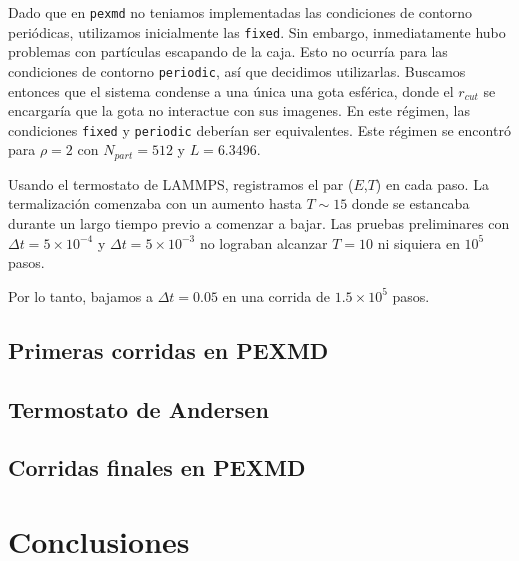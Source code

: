 \documentclass[twoside, 12pt]{article}
\begin{document}
Dado que en \texttt{pexmd} no teniamos implementadas las condiciones de contorno periódicas, utilizamos inicialmente las \texttt{fixed}. Sin embargo, inmediatamente hubo problemas con partículas escapando de la caja. Esto no ocurría para las condiciones de contorno \texttt{periodic}, así que decidimos utilizarlas. Buscamos entonces que el sistema condense a una única una gota esférica, donde el $r_{cut}$ se encargaría que la gota no interactue con sus imagenes. En este régimen, las condiciones \texttt{fixed} y \texttt{periodic} deberían ser equivalentes. Este régimen se encontró para $\rho=2$ con $N_{part}=512$ y $L=6.3496$.

Usando el termostato de LAMMPS, registramos el par ($E$,$T$) en cada paso. La termalización comenzaba con un aumento hasta $T\sim 15$ donde se estancaba durante un largo tiempo previo a comenzar a bajar. Las pruebas preliminares con $\Delta t= 5\times 10^{-4}$ y $\Delta t= 5\times 10^{-3}$ no lograban alcanzar $T=10$ ni siquiera en $10^5$ pasos.

Por lo tanto, bajamos a $\Delta t = 0.05$ en una corrida de $1.5\times10^{5}$ pasos.
\subsection{Primeras corridas en PEXMD}
\subsection{Termostato de Andersen}
\subsection{Corridas finales en PEXMD}

\section{Conclusiones}
\end{document}
